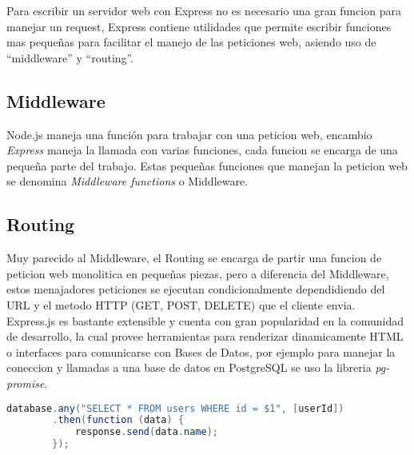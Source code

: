     Para escribir un servidor web con Express no es necesario una gran funcion para manejar un request, Express contiene utilidades que permite escribir funciones mas peque\~nas para facilitar el manejo de las peticiones web, asiendo uso de ``middleware'' y ``routing''.

    \subsection{Middleware}
    \label{sub:middleware}
      Node.js maneja una funci\'on para trabajar con una peticion web, encambio \emph{Express} maneja la llamada con varias funciones, cada funcion se encarga de una peque\~na parte del trabajo. Estas peque\~nas funciones que manejan la peticion web se denomina \emph{Middleware functions} o Middleware.


    \subsection{Routing}
    \label{sub:routing}
      Muy parecido al Middleware, el Routing se encarga de partir una funcion de peticion web monolitica en peque\~nas piezas, pero a diferencia del Middleware, estos menajadores peticiones se ejecutan condicionalmente dependidiendo del URL y el metodo HTTP (GET, POST, DELETE) que el cliente envia.\\


    Express.js es bastante extensible y cuenta con gran popularidad en la comunidad de desarrollo, la cual provee herramientas para renderizar dinamicamente HTML o interfaces para comunicarse con Bases de Datos, por ejemplo para manejar la coneccion y llamadas a una base de datos en PostgreSQL se uso la libreria \emph{pg-promise}.

    \begin{lstlisting}[language=Java]
      database.any("SELECT * FROM users WHERE id = $1", [userId])
        .then(function (data) {
            response.send(data.name);
        });
    \end{lstlisting}




